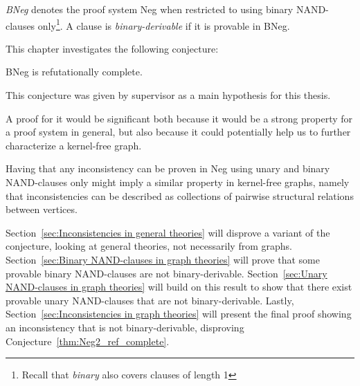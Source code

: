 

\begin{definition}
  \textit{BNeg} denotes the proof system Neg when restricted to using binary NAND-clauses only\footnote{Recall that \textit{binary} also covers clauses of length 1}.
  A clause is \textit{binary-derivable} if it is provable in BNeg.
\end{definition}
This chapter investigates the following conjecture:
\begin{conjecture}
  BNeg is refutationally complete.
  \label{thm:Neg2_ref_complete}
\end{conjecture}
This conjecture was given by supervisor as a main hypothesis for this thesis.

A proof for it would be significant both because it would be a strong property for a proof system in general, but also because it could potentially help us to further characterize a kernel-free graph.

Having that any inconsistency can be proven in Neg using unary and binary NAND-clauses only might imply a similar property in kernel-free graphs, namely that inconsistencies can be described as collections of pairwise structural relations between vertices.

Section~\ref{sec:Inconsistencies in general theories} will disprove a variant of the conjecture, looking at general theories, not necessarily from graphs.
Section~\ref{sec:Binary NAND-clauses in graph theories} will prove that some provable binary NAND-clauses are not binary-derivable.
Section~\ref{sec:Unary NAND-clauses in graph theories} will build on this result to show that there exist provable unary NAND-clauses that are not binary-derivable.
Lastly, Section~\ref{sec:Inconsistencies in graph theories} will present the final proof showing an inconsistency that is not binary-derivable, disproving Conjecture~\ref{thm:Neg2_ref_complete}.
